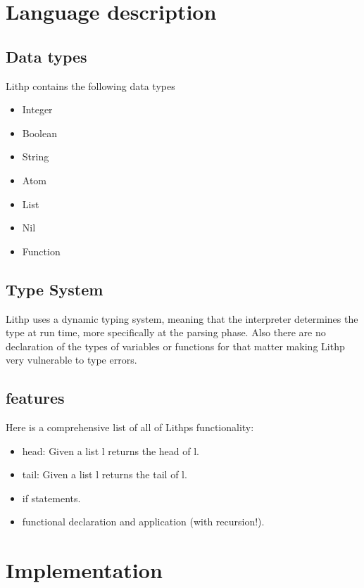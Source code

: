 \documentclass[14pt,a4paper]{article}
\begin{document}
\newpage

\section{Language description}

\subsection{Data types}
Lithp contains the following data types

\begin{itemize}
    \item Integer
    \item Boolean
    \item String
    \item Atom
    \item List
    \item Nil
    \item Function
\end{itemize}


\subsection{Type System}
Lithp uses a dynamic typing system, meaning that the interpreter determines the type at run time, more specifically at the parsing phase.
Also there are no declaration of the types of variables or functions for that matter making Lithp very vulnerable to type errors.

\subsection{features}
Here is a comprehensive list of all of Lithps functionality:

\begin{itemize}
    \item head: Given a list l returns the head of l.
    \item tail: Given a list l returns the tail of l.
    \item if statements.
    \item functional declaration and application (with recursion!).
\end{itemize}

\section{Implementation}
\end{document}

